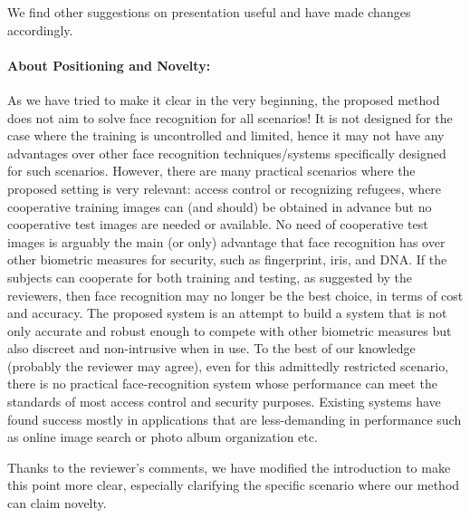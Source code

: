 \documentclass[11pt]{article}
\begin{document}
We find other suggestions on presentation useful and have made changes accordingly. 

\paragraph{About Positioning and Novelty:}
As we have tried to make it clear in the very beginning, the proposed method does not aim to solve face 
recognition for all scenarios! It is not designed for the case where the training is uncontrolled and limited, hence it
may not have any advantages over other face recognition techniques/systems specifically designed for such scenarios. 
However, there are many practical scenarios where the proposed setting is very relevant: access control
or recognizing refugees, where cooperative training images can (and should) be obtained in advance but no cooperative test
images are needed or available. No need of cooperative test images is arguably the main (or only) advantage that 
face recognition has over other biometric measures for security, such as fingerprint, iris, and DNA. 
If the subjects can cooperate for both training and testing, as suggested by the reviewers, then face 
recognition may no longer be the best choice, in terms of cost and accuracy. The proposed system is an attempt
to build a system that is not only accurate and robust enough to compete with other biometric measures but also 
discreet and non-intrusive when in use. To the best of our knowledge (probably the reviewer may agree), even 
for this admittedly restricted scenario, there is no practical face-recognition system whose performance can meet
the standards of most access control and security purposes. Existing systems have found success  mostly in applications
that are less-demanding in performance such as online image search or photo album organization etc. 

Thanks to the reviewer's comments, we have modified the introduction to make this point more clear, especially clarifying the specific scenario where our method can claim novelty.
\end{document}
